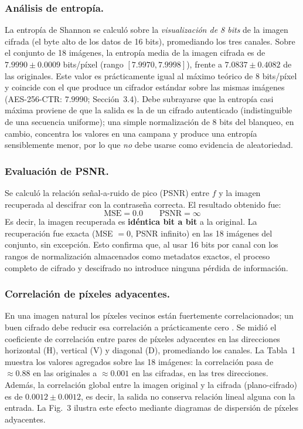 \documentclass{llncs}
\begin{document}
\subsubsection{An\'alisis de entrop\'ia.}
La entrop\'ia de Shannon \cite{shannon} se calcul\'o sobre la
\emph{visualizaci\'on de 8 bits} de la imagen cifrada (el byte alto de los
datos de 16 bits), promediando los tres canales. Sobre el conjunto de 18
im\'agenes, la entrop\'ia media de la imagen cifrada es de
$7.9990 \pm 0.0009$ bits/p\'ixel (rango $[7.9970, 7.9998]$), frente a
$7.0837 \pm 0.4082$ de las originales. Este valor es pr\'acticamente igual
al m\'aximo te\'orico de $8$ bits/p\'ixel y coincide con el que produce un
cifrador est\'andar sobre las mismas im\'agenes (AES-256-CTR: $7.9990$;
Secci\'on~3.4). Debe subrayarse que la entrop\'ia casi m\'axima proviene de
que la salida es la de un cifrado autenticado (indistinguible de una
secuencia uniforme); una simple normalizaci\'on de 8 bits del blanqueo, en
cambio, concentra los valores en una campana y produce una entrop\'ia
sensiblemente menor, por lo que \emph{no} debe usarse como evidencia de
aleatoriedad.

\subsubsection{Evaluaci\'on de PSNR.}
Se calcul\'o la relaci\'on se\~nal-a-ruido de pico (PSNR) \cite{psnr} entre
$f$ y la imagen recuperada al descifrar con la contrase\~na correcta. El
resultado obtenido fue:
\[
\text{MSE} = 0.0 \qquad \text{PSNR} = \infty
\]
Es decir, la imagen recuperada es \textbf{id\'entica bit a bit} a la
original. La recuperaci\'on fue exacta (MSE $=0$, PSNR infinito) en las 18
im\'agenes del conjunto, sin excepci\'on. Esto confirma que, al usar 16 bits
por canal con los rangos de normalizaci\'on almacenados como metadatos
exactos, el proceso completo de cifrado y descifrado no introduce ninguna
p\'erdida de informaci\'on.

\subsubsection{Correlaci\'on de p\'ixeles adyacentes.}
En una imagen natural los p\'ixeles vecinos est\'an fuertemente
correlacionados; un buen cifrado debe reducir esa correlaci\'on a
pr\'acticamente cero \cite{gonzalez}. Se midi\'o el coeficiente de
correlaci\'on entre pares de p\'ixeles adyacentes en las direcciones
horizontal (H), vertical (V) y diagonal (D), promediando los canales. La
Tabla~1 muestra los valores agregados sobre las 18 im\'agenes: la
correlaci\'on pasa de $\approx 0.88$ en las originales a $\approx 0.001$ en
las cifradas, en las tres direcciones. Adem\'as, la correlaci\'on global
entre la imagen original y la cifrada (plano-cifrado) es de
$0.0012 \pm 0.0012$, es decir, la salida no conserva relaci\'on lineal
alguna con la entrada. La Fig.~3 ilustra este efecto mediante diagramas de
dispersi\'on de p\'ixeles adyacentes.
\end{document}
